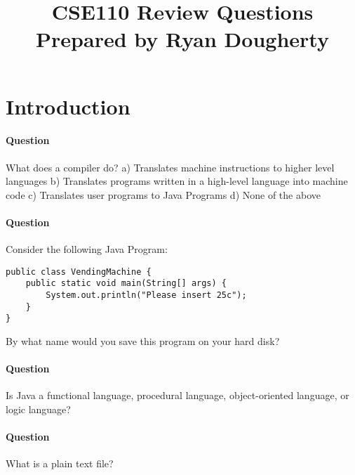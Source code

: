 \documentclass{article}
\date{}
\begin{document}
\title{\textbf{CSE110 Review Questions \\
Prepared by Ryan Dougherty}}
\maketitle

\section*{Introduction}

\setcounter{question_num}{1}
\paragraph{Question }
What does a compiler do?
\newline a) Translates machine instructions to higher level languages
\newline b) Translates programs written in a high-level language into machine code
\newline c) Translates user programs to Java Programs
\newline d) None of the above

\addtocounter{question_num}{1}
\paragraph{Question }
Consider the following Java Program:
\begin{lstlisting}
public class VendingMachine {
	public static void main(String[] args) {
		System.out.println("Please insert 25c");
	}
}
\end{lstlisting}
By what name would you save this program on your hard disk?

\addtocounter{question_num}{1}
\paragraph{Question }
Is Java a functional language, procedural language, object-oriented language, or logic language?

\addtocounter{question_num}{1}
\paragraph{Question }
What is a plain text file? 
\end{document}
